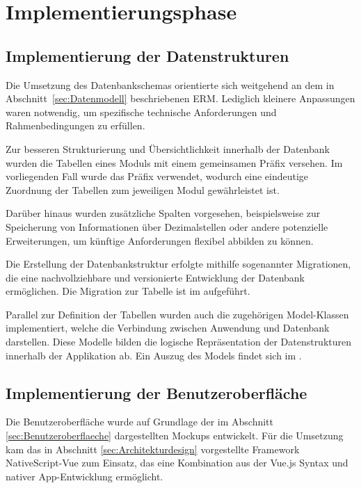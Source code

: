 \section{Implementierungsphase} 
\label{sec:Implementierungsphase}

\subsection{Implementierung der Datenstrukturen}
\label{sec:ImplementierungDatenstrukturen}
	Die Umsetzung des Datenbankschemas orientierte sich weitgehend an dem in Abschnitt~\ref{sec:Datenmodell} beschriebenen \ac{ERM}.
	Lediglich kleinere Anpassungen waren notwendig, um spezifische technische Anforderungen und Rahmenbedingungen zu erfüllen.

	Zur besseren Strukturierung und Übersichtlichkeit innerhalb der Datenbank wurden die Tabellen eines Moduls mit einem gemeinsamen Präfix versehen.
	Im vorliegenden Fall wurde das Präfix  verwendet, wodurch eine eindeutige Zuordnung der Tabellen zum jeweiligen Modul gewährleistet ist.

	Darüber hinaus wurden zusätzliche Spalten vorgesehen, beispielsweise zur Speicherung von Informationen über Dezimalstellen oder
	andere potenzielle Erweiterungen, um künftige Anforderungen flexibel abbilden zu können.

	Die Erstellung der Datenbankstruktur erfolgte mithilfe sogenannter Migrationen,
	die eine nachvollziehbare und versionierte Entwicklung der Datenbank ermöglichen.
	Die Migration zur Tabelle  ist im  aufgeführt.

	Parallel zur Definition der Tabellen wurden auch die zugehörigen Model-Klassen implementiert,
	welche die Verbindung zwischen Anwendung und Datenbank darstellen.
	Diese Modelle bilden die logische Repräsentation der Datenstrukturen innerhalb der Applikation ab.
	Ein Auszug des Models  findet sich im .


\subsection{Implementierung der Benutzeroberfläche}
\label{sec:ImplementierungBenutzeroberflaeche}
	Die Benutzeroberfläche wurde auf Grundlage der im Abschnitt \ref{sec:Benutzeroberflaeche} dargestellten Mockups entwickelt.
	Für die Umsetzung kam das in Abschnitt \ref{sec:Architekturdesign} vorgestellte Framework NativeScript-Vue zum Einsatz,
	das eine Kombination aus der Vue.js Syntax und nativer App-Entwicklung ermöglicht.

